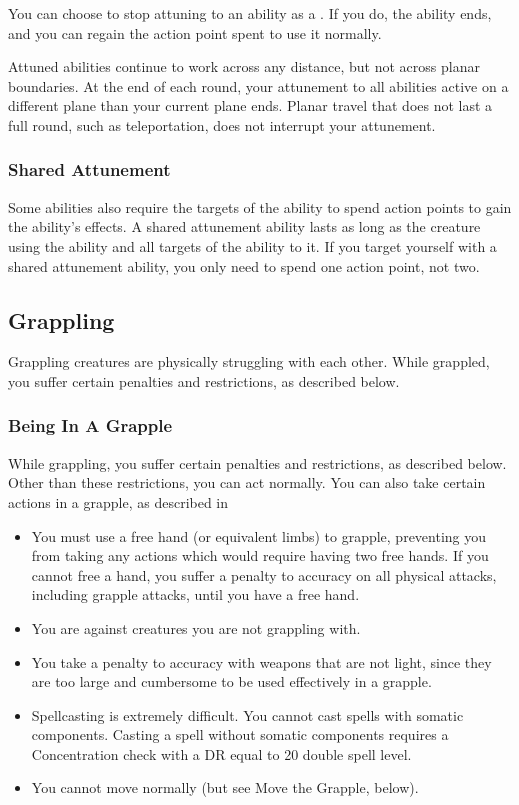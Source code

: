         You can choose to stop attuning to an ability as a .
        If you do, the ability ends, and you can regain the action point spent to use it normally.

        Attuned abilities continue to work across any distance, but not across planar boundaries.
        At the end of each round, your attunement to all abilities active on a different plane than your current plane ends.
        Planar travel that does not last a full round, such as teleportation, does not interrupt your attunement.

        \subsubsection{Shared Attunement}\label{Shared Attunement}
            Some abilities also require the targets of the ability to spend action points to gain the ability's effects.
            A shared attunement ability lasts as long as the creature using the ability and all targets of the ability  to it.
            If you target yourself with a shared attunement ability, you only need to spend one action point, not two.

    \subsection{Grappling}\label{Grappling}
        Grappling creatures are physically struggling with each other. While grappled, you suffer certain penalties and restrictions, as described below.

        \subsubsection{Being In A Grapple}
            While grappling, you suffer certain penalties and restrictions, as described below. Other than these restrictions, you can act normally. You can also take certain actions in a grapple, as described in 
            \begin{itemize}
                \item You must use a free hand (or equivalent limbs) to grapple, preventing you from taking any actions which would require having two free hands. If you cannot free a hand, you suffer a  penalty to accuracy on all physical attacks, including grapple attacks, until you have a free hand.
                \item You are  against creatures you are not grappling with.
                \item You take a  penalty to accuracy with weapons that are not light, since they are too large and cumbersome to be used effectively in a grapple.
                \item Spellcasting is extremely difficult. You cannot cast spells with somatic components. Casting a spell without somatic components requires a Concentration check with a DR equal to 20 \add double spell level.
                \item You cannot move normally (but see Move the Grapple, below).
            \end{itemize}

